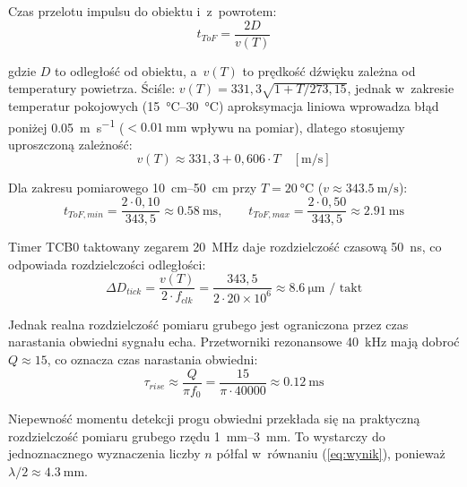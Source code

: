 \documentclass[a4paper,11pt]{article}
\begin{document}
Czas przelotu impulsu do obiektu i~z~powrotem:
\begin{equation}
    t_{ToF} = \frac{2D}{v(T)}
    \label{eq:tof}
\end{equation}

gdzie $D$ to odległość od obiektu, a~$v(T)$ to prędkość dźwięku zależna
od temperatury powietrza. Ściśle: $v(T) = 331{,}3\sqrt{1 + T/273{,}15}$,
jednak w~zakresie temperatur pokojowych (\SIrange{15}{30}{\celsius})
aproksymacja liniowa wprowadza błąd poniżej \SI{0,05}{\metre\per\second}
($< \SI{0,01}{\milli\metre}$ wpływu na pomiar), dlatego stosujemy
uproszczoną zależność:
\begin{equation}
    v(T) \approx 331{,}3 + 0{,}606 \cdot T \quad [\si{\metre\per\second}]
    \label{eq:predkosc_dzwieku}
\end{equation}

Dla zakresu pomiarowego \SIrange{10}{50}{\centi\metre} przy $T = \SI{20}{\celsius}$
($v \approx \SI{343,5}{\metre\per\second}$):
\begin{equation}
    t_{ToF,min} = \frac{2 \cdot 0{,}10}{343{,}5} \approx \SI{0,58}{\milli\second}, \qquad
    t_{ToF,max} = \frac{2 \cdot 0{,}50}{343{,}5} \approx \SI{2,91}{\milli\second}
    \label{eq:tof_zakres}
\end{equation}

Timer TCB0 taktowany zegarem \SI{20}{\mega\hertz} daje rozdzielczość
czasową \SI{50}{\nano\second}, co odpowiada rozdzielczości odległości:
\begin{equation}
    \Delta D_{tick} = \frac{v(T)}{2 \cdot f_{clk}} = \frac{343{,}5}{2 \cdot 20 \times 10^6} \approx \SI{8,6}{\micro\metre} \text{ / takt}
    \label{eq:rozdzielczosc_tick}
\end{equation}

Jednak realna rozdzielczość pomiaru grubego jest ograniczona przez czas narastania
obwiedni sygnału echa. Przetworniki rezonansowe \SI{40}{\kilo\hertz} mają
dobroć $Q \approx 15$, co oznacza czas narastania obwiedni:
\begin{equation}
    \tau_{rise} \approx \frac{Q}{\pi f_0} = \frac{15}{\pi \cdot 40000} \approx \SI{0,12}{\milli\second}
    \label{eq:tau_rise}
\end{equation}

Niepewność momentu detekcji progu obwiedni przekłada się na praktyczną
rozdzielczość pomiaru grubego rzędu \SIrange{1}{3}{\milli\metre}. To wystarczy
do jednoznacznego wyznaczenia liczby $n$ półfal w~równaniu (\ref{eq:wynik}),
ponieważ $\lambda/2 \approx \SI{4,3}{\milli\metre}$.
\end{document}
